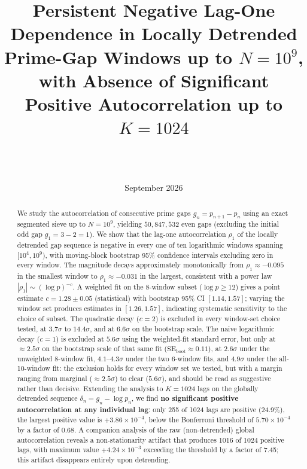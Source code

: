\documentclass[11pt]{article}
\title{Persistent Negative Lag-One Dependence in Locally Detrended\\
Prime-Gap Windows up to $N = 10^9$, with Absence of Significant Positive
Autocorrelation up to $K = 1024$}
\author{\AuthorNames\\ \small \AuthorAffiliations\\ \small \texttt{\AuthorEmail}}
\date{September 2026}
\begin{document}
\maketitle

\begin{abstract}
We study the autocorrelation of consecutive prime gaps
$g_n = p_{n+1} - p_n$ using an exact segmented sieve up to $N = 10^9$,
yielding $50{,}847{,}532$ even gaps (excluding the initial odd gap
$g_1 = 3 - 2 = 1$). We show that the lag-one autocorrelation
$\rho_1$ of the locally detrended gap sequence is negative in every one
of ten logarithmic windows spanning $[10^4, 10^9)$, with moving-block
bootstrap 95\% confidence intervals excluding zero in every window. The
magnitude decays approximately monotonically from $\rho_1 \approx -0.095$
in the smallest window to $\rho_1 \approx -0.031$ in the largest,
consistent with a power law $|\rho_1| \sim (\log p)^{-c}$. A weighted
fit on the 8-window subset ($\log p \ge 12$) gives a point estimate
$c = 1.28 \pm 0.05$ (statistical) with bootstrap 95\% CI $[1.14, 1.57]$;
varying the window set produces estimates in $[1.26, 1.57]$, indicating
systematic sensitivity to the choice of subset. The quadratic decay ($c = 2$) is excluded in every
window-set choice tested, at $3.7\sigma$ to $14.4\sigma$, and at
$6.6\sigma$ on the bootstrap scale. The naive
logarithmic decay ($c = 1$) is excluded at $5.6\sigma$ using the
weighted-fit standard error, but only at $\approx 2.5\sigma$ on the
bootstrap scale of that same fit ($\mathrm{SE}_{\text{boot}} \approx
0.11$), at $2.6\sigma$ under the unweighted 8-window fit,
$4.1$--$4.3\sigma$ under the two 6-window fits, and $4.9\sigma$ under
the all-10-window fit: the exclusion holds for
every window set we tested, but with a margin ranging from marginal
($\approx 2.5\sigma$) to clear ($5.6\sigma$), and should be read as
suggestive rather than decisive.
Extending the analysis to $K = 1024$ lags on the globally detrended
sequence $\delta_n = g_n - \log p_n$, we find \textbf{no significant
positive autocorrelation at any individual lag}: only 255 of 1024 lags
are positive (24.9\%), the largest positive value is
$+3.86 \times 10^{-4}$, below the Bonferroni threshold of
$5.70 \times 10^{-4}$ by a factor of 0.68. A companion analysis of the
raw (non-detrended) global autocorrelation reveals a non-stationarity
artifact that produces 1016 of 1024 positive lags, with maximum value
$+4.24 \times 10^{-3}$ exceeding the threshold by a factor of 7.45;
this artifact disappears entirely upon detrending.


\end{abstract}
\end{document}
